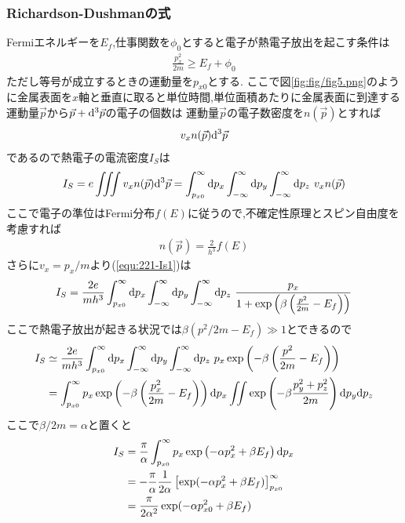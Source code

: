 \subsubsection{Richardson-Dushmanの式}
Fermiエネルギーを$E_f$,仕事関数を$\phi_0$とすると電子が熱電子放出を起こす条件は
\begin{align}
  \label{equ:221-condition}
  \frac{p_x^2}{2m}\geq E_f+\phi_0
\end{align}
ただし等号が成立するときの運動量を$p_{x0}$とする.
ここで図\ref{fig:fig/fig5.png}のように金属表面を$x$軸と垂直に取ると単位時間,単位面積あたりに金属表面に到達する運動量$\vec{p}$から$\vec{p}+{\rm d}^3\vec{p}$の電子の個数は
運動量$\vec{p}$の電子数密度を$n(\vec{p})$とすれば
\begin{align}
  v_xn(\vec{p}){\rm d}^3\vec{p}
\end{align}
であるので熱電子の電流密度$I_S$は
\begin{align}
  \label{equ:221-Is1}
  I_S=e\iiint v_xn(\vec{p}){\rm d}^3\vec{p}=\int_{p_{x0}}^\infty{\rm d}p_x\int_{-\infty}^\infty{\rm d}p_y\int_{-\infty}^\infty{\rm d}p_z\ v_xn(\vec{p})
\end{align}
ここで電子の準位はFermi分布$f(E)$に従うので,不確定性原理とスピン自由度を考慮すれば
\begin{align}
  n(\vec{p})=\frac{2}{h^3}f(E)
\end{align}
さらに$v_x=p_x/m$より(\ref{equ:221-Is1})は
\begin{align}
  I_S=\frac{2e}{mh^3}\int_{p_{x0}}^\infty{\rm d}p_x\int_{-\infty}^\infty{\rm d}p_y\int_{-\infty}^\infty{\rm d}p_z\ \frac{p_x}{1+\exp\left(\beta\left(\frac{p^2}{2m}-E_f\right)\right)}
\end{align}
ここで熱電子放出が起きる状況では$\beta(p^2/2m-E_f)\gg 1$とできるので
\begin{align}
  \begin{split}
    I_S&\simeq\frac{2e}{mh^3}\int_{p_{x0}}^\infty{\rm d}p_x\int_{-\infty}^\infty{\rm d}p_y\int_{-\infty}^\infty{\rm d}p_z\ p_x\exp\left(-\beta\left(\frac{p^2}{2m}-E_f\right)\right)\\
    &=\int_{p_{x0}}^\infty p_x\exp\left(-\beta\left(\frac{p_x^2}{2m}-E_f\right)\right){\rm d}p_x\iint\exp\left(-\beta\frac{p_y^2+p_z^2}{2m}\right){\rm d}p_y{\rm d}p_z
  \end{split}
\end{align}
ここで$\beta/2m=\alpha$と置くと
\begin{align}
  \begin{split}
    I_S&=\frac{\pi}{\alpha}\int_{p_{x0}}^\infty p_x\exp\left(-\alpha p_x^2+\beta E_f\right){\rm d}p_x\\
    &=-\frac{\pi}{\alpha}\frac{1}{2\alpha}\left[\exp(-\alpha p_x^2+\beta E_f)\right]_{p_{x0}}^\infty\\
    &=\frac{\pi}{2\alpha^2}\exp(-\alpha p_{x0}^2+\beta E_f)
  \end{split}
\end{align}

